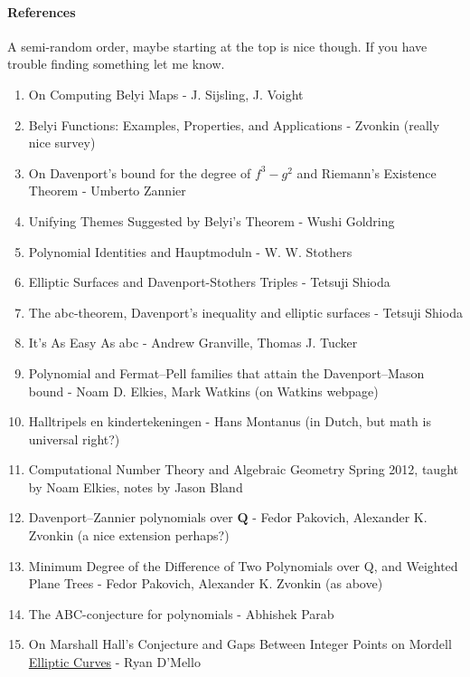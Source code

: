 \documentclass[10pt,]{book}
\numberwithin{equation}{section}
\newcommand{\QQ}{\mathbf{Q}}
\begin{document}
\paragraph[{References}]{References}\hypertarget{paragraphs-19}{}
\hypertarget{p-734}{}%
A semi-random order, maybe starting at the top is nice though. If you have trouble finding something let me know.\leavevmode%
\begin{enumerate}
\item\hypertarget{li-150}{}On Computing Belyi Maps - J. Sijsling, J. Voight%
\item\hypertarget{li-151}{}Belyi Functions: Examples, Properties, and Applications - Zvonkin (really nice survey)%
\item\hypertarget{li-152}{}On Davenport’s bound for the degree of \(f^3 - g^2\) and Riemann's Existence Theorem - Umberto Zannier%
\item\hypertarget{li-153}{}Unifying Themes Suggested by Belyi's Theorem - Wushi Goldring%
\item\hypertarget{li-154}{}Polynomial Identities and Hauptmoduln - W. W. Stothers%
\item\hypertarget{li-155}{}Elliptic Surfaces and Davenport-Stothers Triples -  Tetsuji Shioda%
\item\hypertarget{li-156}{}The abc-theorem, Davenport’s inequality and elliptic surfaces - Tetsuji Shioda%
\item\hypertarget{li-157}{}It's As Easy As abc -  Andrew Granville, Thomas J. Tucker%
\item\hypertarget{li-158}{}Polynomial and Fermat–Pell families that attain the Davenport–Mason bound - Noam D. Elkies, Mark Watkins (on Watkins webpage)%
\item\hypertarget{li-159}{}Halltripels en kindertekeningen - Hans Montanus (in Dutch, but math is universal right?)%
\item\hypertarget{li-160}{}Computational Number Theory and Algebraic Geometry Spring 2012, taught by Noam Elkies, notes by Jason Bland%
\item\hypertarget{li-161}{}Davenport–Zannier polynomials over \(\QQ\) - Fedor Pakovich, Alexander K. Zvonkin (a nice extension perhaps?)%
\item\hypertarget{li-162}{}Minimum Degree of the Difference of Two Polynomials over Q, and Weighted Plane Trees -  Fedor Pakovich,  Alexander K. Zvonkin (as above)%
\item\hypertarget{li-163}{}The ABC-conjecture for polynomials - Abhishek Parab%
\item\hypertarget{li-164}{}On Marshall Hall's Conjecture and Gaps Between Integer Points on Mordell \hyperref[def-supersing-isog-ec]{Elliptic Curves} - Ryan D'Mello%

\end{enumerate}
\end{document}
